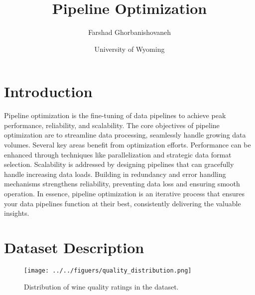\documentclass[
	letterpaper, %
	12pt, %
	unnumberedsections, %
	twoside, %
]{LTJournalArticle}
\title{Pipeline Optimization} %
\author{%
	Farshad Ghorbanishovaneh	
}
\date{\footnotesize University of Wyoming}
\begin{document}
\maketitle %


\section{Introduction}
Pipeline optimization is the fine-tuning of data pipelines to achieve peak performance, reliability, and scalability.  The core objectives of pipeline optimization are to streamline data processing, seamlessly handle growing data volumes. Several key areas benefit from optimization efforts.  Performance can be enhanced through techniques like parallelization and strategic data format selection.  Scalability is addressed by designing pipelines that can gracefully handle increasing data loads. Building in redundancy and error handling mechanisms strengthens reliability, preventing data loss and ensuring smooth operation. In essence, pipeline optimization is an iterative process that ensures your data pipelines function at their best, consistently delivering the valuable insights.


\section{Dataset Description}
\begin{figure}
	\texttt{[image: ../../figuers/quality\_distribution.png]}
	\caption{Distribution of wine quality ratings in the dataset.}
	\label{fig:winequality}
\end{figure}
\end{document}
